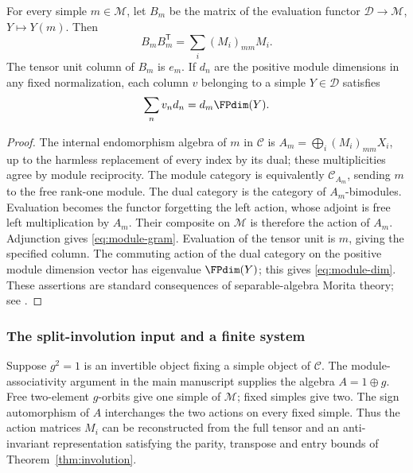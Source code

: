 \begin{proposition}\label{prop:dual-module-gram}
For every simple $m\in\mathcal M$, let $B_m$ be the matrix of the evaluation
functor $\mathcal D\to\mathcal M$, $Y\mapsto Y(m)$. Then
\begin{equation}\label{eq:module-gram}
 B_mB_m^{\mathsf T}=\sum_i(M_i)_{mm}M_i.
\end{equation}
The tensor unit column of $B_m$ is $e_m$. If $d_n$ are the positive module
dimensions in any fixed normalization, each column $v$ belonging to a
simple $Y\in\mathcal D$ satisfies
\begin{equation}\label{eq:module-dim}
 \sum_n v_nd_n=d_m\FPdim(Y).
\end{equation}
\end{proposition}
\begin{proof}
The internal endomorphism algebra of $m$ in $\mathcal C$ is
$A_m=\bigoplus_i(M_i)_{mm}X_i$, up to the harmless replacement of every
index by its dual; these multiplicities agree by module reciprocity.
The module category is equivalently $\mathcal C_{A_m}$, sending $m$ to
the free rank-one module. The dual category is the category of
$A_m$-bimodules. Evaluation becomes the functor forgetting the left action,
whose adjoint is free left multiplication by $A_m$. Their composite on
$\mathcal M$ is therefore the action of $A_m$. Adjunction gives
\eqref{eq:module-gram}. Evaluation of the tensor unit is $m$, giving the
specified column. The commuting action of the dual category on the
positive module dimension vector has eigenvalue $\FPdim(Y)$; this gives
\eqref{eq:module-dim}. These assertions are standard consequences of
separable-algebra Morita theory; see \cite[Chapter~7]{EGNO}.
\end{proof}

\subsubsection{The split-involution input and a finite system}
Suppose $g^2=1$ is an invertible object fixing a simple object of
$\mathcal C$. The module-associativity argument in the main manuscript
supplies the algebra $A=1\oplus g$. Free two-element $g$-orbits give one
simple of $\mathcal M$; fixed simples give two. The sign automorphism of
$A$ interchanges the two actions on every fixed simple. Thus the action
matrices $M_i$ can be reconstructed from the full tensor and an
anti-invariant representation satisfying the parity, transpose and entry
bounds of Theorem~\ref{thm:involution}.

